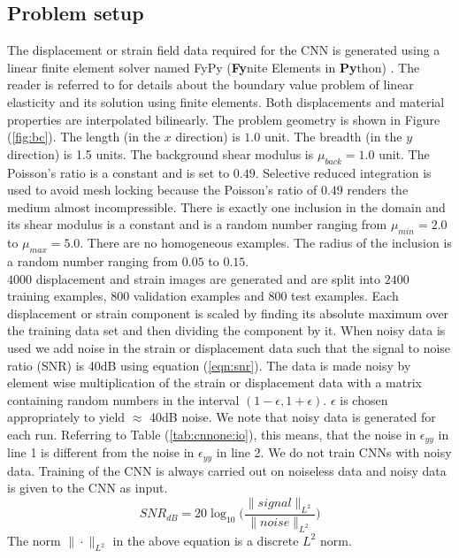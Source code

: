 \documentclass[12pt]{article}
\begin{document}
\subsection{\label{sect:probsetup}Problem setup}
The displacement or strain field data required for the CNN is generated using a linear finite element solver named FyPy (\textbf{Fy}nite Elements in \textbf{Py}thon) \cite{misc:fypy}. The reader is referred to \cite{book:hugheslinear,book:fishbelytschko} for details about the boundary value problem of linear elasticity and its solution using finite elements. Both displacements and material properties are interpolated bilinearly. The problem geometry is shown in Figure (\ref{fig:bc}). The length (in the $x$ direction) is $1.0$ unit. The breadth (in the $y$ direction) is 1.5 units. The background shear modulus is $\mu_{back}=1.0$ unit. The Poisson's ratio is a constant and is set to $0.49$. Selective reduced integration is used to avoid mesh locking because the Poisson's ratio of $0.49$ renders the medium almost incompressible. There is exactly one inclusion in the domain and its shear modulus is a constant and is a random number ranging from $\mu_{min}=2.0$ to $\mu_{max}=5.0$. There are no homogeneous examples. The radius of the inclusion is a random number ranging from $0.05$ to $0.15$.\\
$4000$ displacement and strain images are generated and are split into $2400$ training examples, $800$ validation examples and $800$ test examples. Each displacement or strain component is scaled by finding its absolute maximum over the training data set and then dividing the component by it. When noisy data is used we add noise in the strain or displacement data such that the signal to noise ratio (SNR) is 40dB using equation (\ref{eqn:snr}). The data is made noisy by element wise multiplication of the strain or displacement data with a matrix containing random numbers in the interval $(1-\epsilon,1+\epsilon)$. $\epsilon$ is chosen appropriately to yield $\approx$ 40dB noise. We note that noisy data is generated for each run. Referring to Table (\ref{tab:cnnone:io}), this means, that the noise in $\epsilon_{yy}$ in line 1 is different from the noise in $\epsilon_{yy}$ in line 2. We do not train CNNs with noisy data. Training of the CNN is always carried out on noiseless data and noisy data is given to the CNN as input. 
\begin{equation}
  \label{eqn:snr}
  SNR_{dB} = 20\log_{10}\Big(\frac{\|signal\|_{L^2}}{\|noise\|_{L^2}}\Big)
\end{equation}
The norm $\|\cdot\|_{L^2}$ in the above equation is a discrete $L^2$ norm. 
\end{document}
